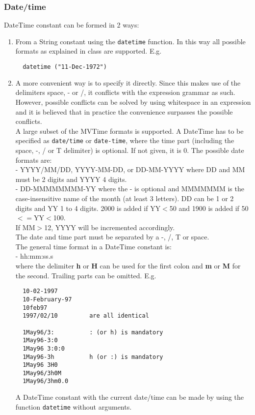 \subsubsection{\label{TAQL:DATETIMECONST}Date/time}
  DateTime constant can be formed in 2 ways:
  \begin{enumerate}
  \item From a String constant using the \texttt{datetime} function.
    In this way all possible formats as explained in class
    are supported. E.g.
\begin{verbatim}
  datetime ("11-Dec-1972")
\end{verbatim}
  \item A more convenient way is to specify it directly. Since this
    makes use of the delimiters space, - or /, it conflicts with the
    expression grammar as such. However, possible conflicts can be
    solved by using whitespace in an expression and it is believed
    that in practice the convenience surpasses the possible
    conflicts.
    \\A large subset of the MVTime formats is supported.
    A DateTime has to be specified as \texttt{date/time}
    or \texttt{date-time}, where the time part (including
    the space, -, / or T delimiter) is optional. If not given, it is 0.
    The possible date formats are:
    \\- YYYY/MM/DD, YYYY-MM-DD, or DD-MM-YYYY where DD and MM must
    be 2 digits and YYYY 4 digits.
    \\- DD-MMMMMMMM-YY where the - is optional and MMMMMMM is the
    case-insensitive name of the month (at least 3 letters). 
    DD can be 1 or 2 digits and YY 1 to 4 digits. 2000 is added if YY$<$50 and
    1900 is added if 50$<=$YY$<$100.
    \\If MM$>$12, YYYY will be incremented accordingly.
    \\The date and time part must be separated by a -, /, T or space.
    \\The general time format in a DateTime constant is:
    \\- hh:mm:ss.s
    \\where the delimiter \textbf{h} or \textbf{H} can be used
    for the first colon and \textbf{m} or \textbf{M} for the second.
    Trailing parts can be omitted. E.g.
\begin{verbatim}
  10-02-1997
  10-February-97
  10feb97
  1997/02/10         are all identical

  1May96/3:          : (or h) is mandatory
  1May96-3:0
  1May96 3:0:0
  1May96-3h          h (or :) is mandatory
  1May96 3H0
  1May96/3h0M
  1May96/3hm0.0
\end{verbatim}
    A DateTime constant with the current date/time can be made
    by using the function \texttt{datetime} without arguments.
  \end{enumerate}

